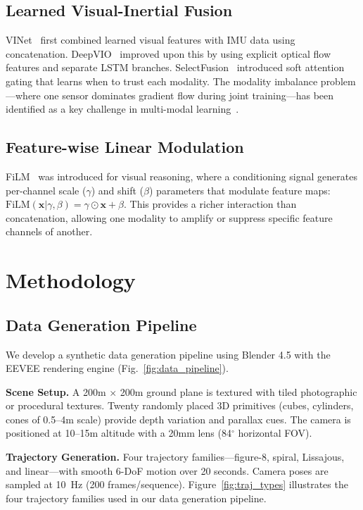 \documentclass[conference]{IEEEtran}
\begin{document}
\subsection{Learned Visual-Inertial Fusion}
VINet~\cite{clark2017} first combined learned visual features with IMU data using concatenation. DeepVIO~\cite{han2019} improved upon this by using explicit optical flow features and separate LSTM branches. SelectFusion~\cite{chen2019} introduced soft attention gating that learns when to trust each modality. The modality imbalance problem---where one sensor dominates gradient flow during joint training---has been identified as a key challenge in multi-modal learning~\cite{wang2020multimodal}.

\subsection{Feature-wise Linear Modulation}
FiLM~\cite{perez2018} was introduced for visual reasoning, where a conditioning signal generates per-channel scale ($\gamma$) and shift ($\beta$) parameters that modulate feature maps: $\text{FiLM}(\mathbf{x} | \gamma, \beta) = \gamma \odot \mathbf{x} + \beta$. This provides a richer interaction than concatenation, allowing one modality to amplify or suppress specific feature channels of another.

\section{Methodology}

\subsection{Data Generation Pipeline}

We develop a synthetic data generation pipeline using Blender 4.5 with the EEVEE rendering engine (Fig.~\ref{fig:data_pipeline}).

\textbf{Scene Setup.} A 200m $\times$ 200m ground plane is textured with tiled photographic or procedural textures. Twenty randomly placed 3D primitives (cubes, cylinders, cones of 0.5--4m scale) provide depth variation and parallax cues. The camera is positioned at 10--15m altitude with a 20mm lens (84$^\circ$ horizontal FOV).

\textbf{Trajectory Generation.} Four trajectory families---figure-8, spiral, Lissajous, and linear---with smooth 6-DoF motion over 20 seconds. Camera poses are sampled at 10~Hz (200 frames/sequence). Figure~\ref{fig:traj_types} illustrates the four trajectory families used in our data generation pipeline.
\end{document}
